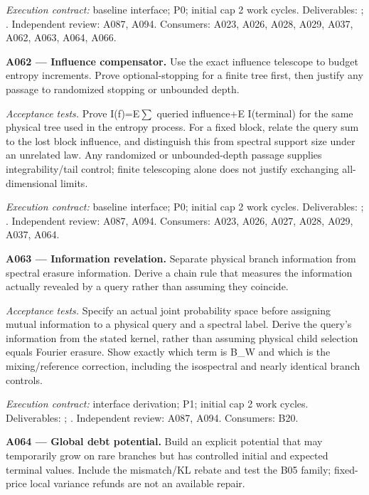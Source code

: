 \documentclass[11pt]{article}
\begin{document}
{\small\emph{Execution contract:} baseline interface; P0; initial cap 2 work cycles. Deliverables: ; . Independent review: A087, A094. Consumers: A023, A026, A028, A029, A037, A062, A063, A064, A066.}

\textbf{A062 --- Influence compensator.} Use the exact influence telescope to budget entropy increments. Prove optional-stopping for a finite tree first, then justify any passage to randomized stopping or unbounded depth.

\emph{Acceptance tests.} Prove I(f)=E$\sum$ queried influence+E I(terminal) for the same physical tree used in the entropy process. For a fixed block, relate the query sum to the lost block influence, and distinguish this from spectral support size under an unrelated law. Any randomized or unbounded-depth passage supplies integrability/tail control; finite telescoping alone does not justify exchanging all-dimensional limits.

{\small\emph{Execution contract:} baseline interface; P0; initial cap 2 work cycles. Deliverables: ; . Independent review: A087, A094. Consumers: A023, A026, A027, A028, A029, A037, A064.}

\textbf{A063 --- Information revelation.} Separate physical branch information from spectral erasure information. Derive a chain rule that measures the information actually revealed by a query rather than assuming they coincide.

\emph{Acceptance tests.} Specify an actual joint probability space before assigning mutual information to a physical query and a spectral label. Derive the query's information from the stated kernel, rather than assuming physical child selection equals Fourier erasure. Show exactly which term is B\_W and which is the mixing/reference correction, including the isospectral and nearly identical branch controls.

{\small\emph{Execution contract:} interface derivation; P1; initial cap 2 work cycles. Deliverables: ; . Independent review: A087, A094. Consumers: B20.}

\textbf{A064 --- Global debt potential.} Build an explicit potential that may temporarily grow on rare branches but has controlled initial and expected terminal values. Include the mismatch/KL rebate and test the B05 family; fixed-price local variance refunds are not an available repair.
\end{document}
